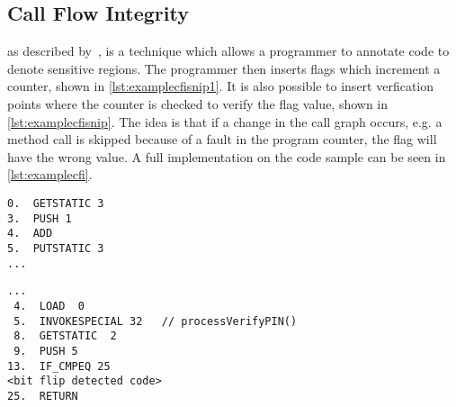 \subsection{Call Flow Integrity} as described by~\cite{agl}, is a technique which allows a programmer to annotate code to denote sensitive regions. The programmer then inserts flags which increment a counter, shown in \cref{lst:examplecfisnip1}. It is also possible to insert verfication points where the counter is checked to verify the flag value, shown in \cref{lst:examplecfisnip}. The idea is that if a change in the call graph occurs, e.g. a method call is skipped because of a fault in the program counter, the flag will have the wrong value. A full implementation on the code sample can be seen in \cref{lst:examplecfi}.

\begin{lstlisting}[caption={Java code example of the control flow integrity countermeasure incrementing the control flow flag},label={lst:examplecfisnip1}]
0.  GETSTATIC 3
3.  PUSH 1
4.  ADD
5.  PUTSTATIC 3
...
\end{lstlisting}

\begin{lstlisting}[caption={Java code example of the control flow integrity countermeasure checking the control flow flag},label={lst:examplecfisnip}]
...
 4.  LOAD  0
 5.  INVOKESPECIAL 32   // processVerifyPIN()
 8.  GETSTATIC  2
 9.  PUSH 5
13.  IF_CMPEQ 25
<bit flip detected code>
25.  RETURN
\end{lstlisting}


